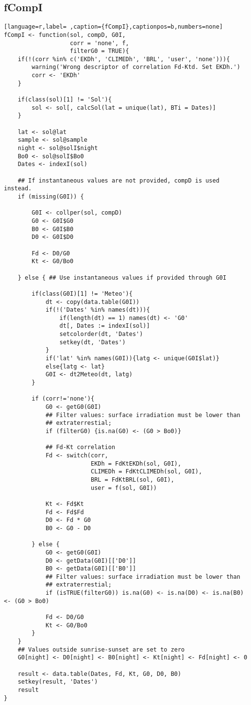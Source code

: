 \subsection{fCompI}
\label{sec:orgcffffb7}
\label{subsec:fcompi}
\begin{lstlisting}[language=r,label= ,caption={fCompI},captionpos=b,numbers=none]
fCompI <- function(sol, compD, G0I,
                   corr = 'none', f,
                   filterG0 = TRUE){
    if(!(corr %in% c('EKDh', 'CLIMEDh', 'BRL', 'user', 'none'))){
        warning('Wrong descriptor of correlation Fd-Ktd. Set EKDh.')
        corr <- 'EKDh'
    }

    if(class(sol)[1] != 'Sol'){
        sol <- sol[, calcSol(lat = unique(lat), BTi = Dates)]
    }

    lat <- sol@lat
    sample <- sol@sample
    night <- sol@solI$night
    Bo0 <- sol@solI$Bo0
    Dates <- indexI(sol)

    ## If instantaneous values are not provided, compD is used instead.
    if (missing(G0I)) { 

        G0I <- collper(sol, compD)
        G0 <- G0I$G0
        B0 <- G0I$B0
        D0 <- G0I$D0

        Fd <- D0/G0
        Kt <- G0/Bo0

    } else { ## Use instantaneous values if provided through G0I

        if(class(G0I)[1] != 'Meteo'){
            dt <- copy(data.table(G0I))
            if(!('Dates' %in% names(dt))){
                if(length(dt) == 1) names(dt) <- 'G0'
                dt[, Dates := indexI(sol)]
                setcolorder(dt, 'Dates')
                setkey(dt, 'Dates')
            }
            if('lat' %in% names(G0I)){latg <- unique(G0I$lat)}
            else{latg <- lat}
            G0I <- dt2Meteo(dt, latg)
        }

        if (corr!='none'){
            G0 <- getG0(G0I)
            ## Filter values: surface irradiation must be lower than
            ## extraterrestial; 
            if (filterG0) {is.na(G0) <- (G0 > Bo0)}

            ## Fd-Kt correlation
            Fd <- switch(corr,
                         EKDh = FdKtEKDh(sol, G0I),
                         CLIMEDh = FdKtCLIMEDh(sol, G0I),
                         BRL = FdKtBRL(sol, G0I), 
                         user = f(sol, G0I))

            Kt <- Fd$Kt
            Fd <- Fd$Fd
            D0 <- Fd * G0
            B0 <- G0 - D0

        } else { 
            G0 <- getG0(G0I)
            D0 <- getData(G0I)[['D0']]
            B0 <- getData(G0I)[['B0']]
            ## Filter values: surface irradiation must be lower than
            ## extraterrestial; 
            if (isTRUE(filterG0)) is.na(G0) <- is.na(D0) <- is.na(B0) <- (G0 > Bo0)

            Fd <- D0/G0
            Kt <- G0/Bo0
        }
    }
    ## Values outside sunrise-sunset are set to zero
    G0[night] <- D0[night] <- B0[night] <- Kt[night] <- Fd[night] <- 0

    result <- data.table(Dates, Fd, Kt, G0, D0, B0)
    setkey(result, 'Dates')
    result
}
\end{lstlisting}
